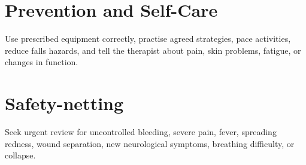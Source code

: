 \section*{Prevention and Self-Care}
Use prescribed equipment correctly, practise agreed strategies, pace activities, reduce falls hazards, and tell the therapist about pain, skin problems, fatigue, or changes in function.
\section*{Safety-netting}
Seek urgent review for uncontrolled bleeding, severe pain, fever, spreading redness, wound separation, new neurological symptoms, breathing difficulty, or collapse.
